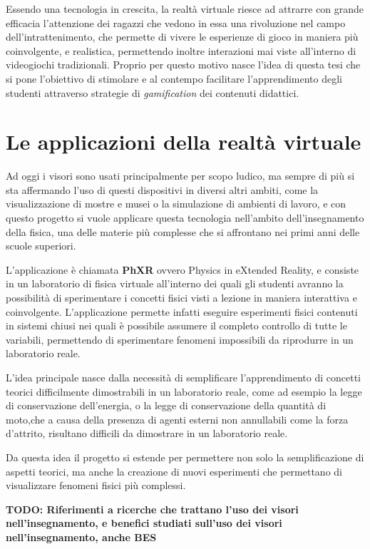Essendo una tecnologia in crescita, la realtà virtuale riesce ad attrarre con grande
efficacia l'attenzione dei ragazzi che vedono in essa una rivoluzione nel campo dell'intrattenimento,
che permette di vivere le esperienze di gioco in maniera più coinvolgente, e realistica,
permettendo inoltre interazioni mai viste all'interno di videogiochi
tradizionali. Proprio per questo motivo nasce l'idea di questa tesi che si pone l'obiettivo
di stimolare e al contempo facilitare l'apprendimento degli studenti attraverso strategie
di \textit{gamification} dei contenuti didattici.

\section*{Le applicazioni della realtà virtuale}
\label{sec:le-applicazioni-della-realta-virtuale}

Ad oggi i visori sono usati principalmente per scopo ludico, ma sempre di più si
sta affermando l'uso di questi dispositivi in diversi altri ambiti, come la visualizzazione
di mostre e musei o la simulazione di ambienti di lavoro, e con questo progetto
si vuole applicare questa tecnologia nell'ambito dell'insegnamento della fisica,
una delle materie più complesse che si affrontano nei primi anni delle scuole superiori.

L'applicazione è chiamata \textbf{PhXR} ovvero Physics in eXtended Reality, e consiste
in un laboratorio di fisica virtuale all'interno dei quali gli studenti avranno la
possibilità di sperimentare i concetti fisici visti a lezione in maniera interattiva
e coinvolgente. L'applicazione permette infatti eseguire esperimenti fisici
contenuti in sistemi chiusi nei quali è possibile assumere il completo controllo
di tutte le variabili, permettendo di sperimentare fenomeni impossibili da riprodurre
in un laboratorio reale.

L'idea principale nasce dalla necessità di semplificare l'apprendimento di concetti
teorici difficilmente dimostrabili in un laboratorio reale, come ad esempio la
legge di conservazione dell'energia, o la legge di conservazione della quantità di
moto,che a causa della presenza di agenti esterni non annullabili come la forza d'attrito,
risultano difficili da dimostrare in un laboratorio reale.

Da questa idea il progetto si estende per permettere non solo la semplificazione
di aspetti teorici, ma anche la creazione di nuovi esperimenti che permettano di
visualizzare fenomeni fisici più complessi.

\textbf{TODO: Riferimenti a ricerche che trattano l'uso dei visori nell'insegnamento,
e benefici studiati sull'uso dei visori nell'insegnamento, anche BES}
